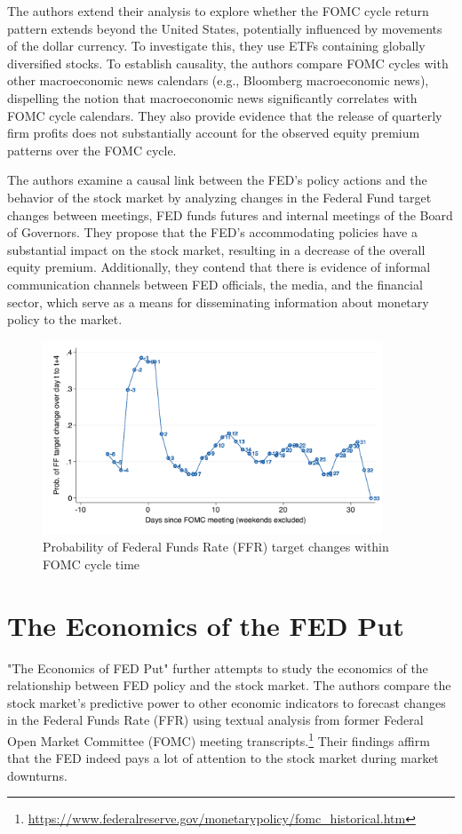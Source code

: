 The authors extend their analysis to explore whether the FOMC cycle return pattern extends beyond the United States, potentially influenced by movements of the dollar currency. To investigate this, they use ETFs containing globally diversified stocks. To establish causality, the authors compare FOMC cycles with other macroeconomic news calendars (e.g., Bloomberg macroeconomic news), dispelling the notion that macroeconomic news significantly correlates with FOMC cycle calendars. They also provide evidence that the release of quarterly firm profits does not substantially account for the observed equity premium patterns over the FOMC cycle.

The authors examine a causal link between the FED's policy actions and the behavior of the stock market by analyzing changes in the Federal Fund target changes between meetings,  FED funds futures and internal meetings of the Board of Governors. They propose that the FED's accommodating policies have a substantial impact on the stock market, resulting in a decrease of the overall equity premium.  Additionally, they contend that there is evidence of informal communication channels between FED officials, the media, and the financial sector, which serve as a means for disseminating information about monetary policy to the market.

\begin{figure}[h]
    \centering
    \label{cies19_fig3A}
    \includegraphics[width=0.9\textwidth]{figures/cies19/fig3A}
    \caption{Probability of Federal Funds Rate (FFR) target changes within FOMC cycle time \parencite{cieslak_stock_2019} }
\end{figure}

\pagebreak

\section{The Economics of the FED Put}
"The Economics of FED Put" \parencite{cieslak_economics_2021} further attempts to study the economics of the relationship between FED policy and the stock market. The authors compare the stock market's predictive power to other economic indicators to forecast changes in the Federal Funds Rate (FFR) using textual analysis from former Federal Open Market Committee (FOMC) meeting transcripts.\footnote{\url{https://www.federalreserve.gov/monetarypolicy/fomc_historical.htm}} Their findings affirm that the FED indeed pays a lot of attention to the stock market during market downturns.

